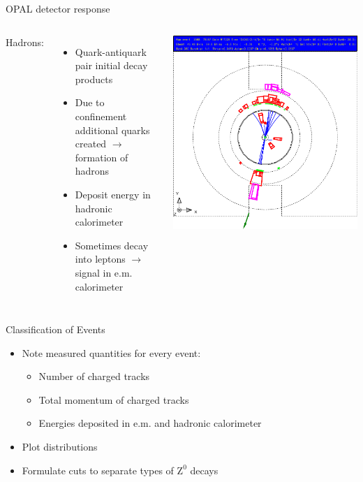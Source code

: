 \documentclass[11pt,xcolor=dvipsnames,professionalfonts]{beamer}
\begin{document}
\begin{frame}{OPAL detector response}
	\begin{columns}
		Hadrons:
		\begin{itemize}
			\setlength\itemsep{.5em}
			\item Quark-antiquark pair initial decay products
			\item Due to confinement additional quarks created $\rightarrow$ formation of hadrons
			\item Deposit energy in hadronic calorimeter
			\item Sometimes decay into leptons $\rightarrow$ signal in e.m. calorimeter
		\end{itemize}
		\includegraphics[width=1.0\textwidth]{./talkfigs/pdf/qq_04.pdf}
	\end{columns}
\end{frame}

\begin{frame}{Classification of Events}
	\begin{itemize}
		\setlength\itemsep{1em}
		\item Note measured quantities for every event:
		\begin{itemize}
			\setlength\itemsep{.5em}
			\item Number of charged tracks
			\item Total momentum of charged tracks
			\item Energies deposited in e.m. and hadronic calorimeter
		\end{itemize}
		\item Plot distributions
		\item Formulate cuts to separate types of $\mathrm{Z}^0$ decays
	\end{itemize}
\end{frame}
\end{document}
